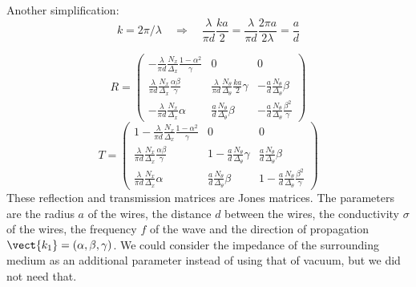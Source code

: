 Another simplification:
\begin{equation}
    k = 2\pi / \lambda
    \quad \Rightarrow \quad
    \frac{\lambda}{\pi d} \frac{ka}{2}
    =
    \frac{\lambda}{\pi d} \frac{2\pi a}{2\lambda}
    =
    \frac{a}{d}
\end{equation}

\begin{equation}
    R =
    \begin{pmatrix}
        -\frac{\lambda}{\pi d}
        \frac{N_x}{\Delta_x}
        \frac{1 - \alpha^2}{\gamma}
        &
        0
        &
        0
        \\
        \frac{\lambda}{\pi d}
        \frac{N_x}{\Delta_x}
        \frac{\alpha \beta}{\gamma}
        &
        \frac{\lambda}{\pi d}
        \frac{N_\theta}{\Delta_\theta}
        \frac{ka}{2}
        \gamma
        &
        -
        \frac{a}{d}
        \frac{N_\theta}{\Delta_\theta}
        \beta
        \\
        -
        \frac{\lambda}{\pi d}
        \frac{N_x}{\Delta_x}
        \alpha
        &
        \frac{a}{d}
        \frac{N_\theta}{\Delta_\theta}
        \beta
        &
        -
        \frac{a}{d}
        \frac{N_\theta}{\Delta_\theta}
        \frac{\beta^2}{\gamma}
    \end{pmatrix}
\end{equation}
\begin{equation}
    T =
    \begin{pmatrix}
        1 -
        \frac{\lambda}{\pi d}
        \frac{N_x}{\Delta_x}
        \frac{1 - \alpha^2}{\gamma}
        &
        0
        &
        0
        \\
        \frac{\lambda}{\pi d}
        \frac{N_x}{\Delta_x}
        \frac{\alpha \beta}{\gamma}
        &
        1 -
        \frac{a}{d}
        \frac{N_\theta}{\Delta_\theta}
        \gamma
        &
        \frac{a}{d}
        \frac{N_\theta}{\Delta_\theta}
        \beta
        \\
        \frac{\lambda}{\pi d}
        \frac{N_x}{\Delta_x}
        \alpha
        &
        \frac{a}{d}
        \frac{N_\theta}{\Delta_\theta}
        \beta
        &
        1 -
        \frac{a}{d}
        \frac{N_\theta}{\Delta_\theta}
        \frac{\beta^2}{\gamma}
    \end{pmatrix}
\end{equation}
These reflection and transmission matrices are Jones matrices.
The parameters are the radius $a$ of the wires,
the distance $d$ between the wires,
the conductivity $\sigma$ of the wires,
the frequency $f$ of the wave and
the direction of propagation $\vect{k_1}=(\alpha, \beta, \gamma)$.
We could consider the impedance of the surrounding medium as an additional parameter instead of using that of vacuum, but we did not need that.

